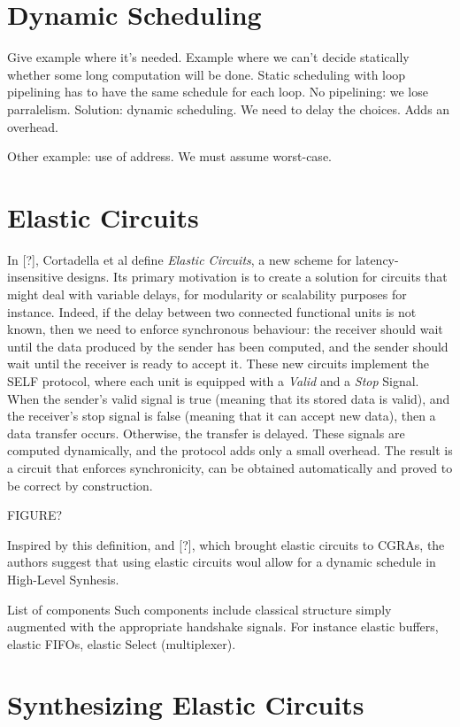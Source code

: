\documentclass{article}
\def\todo#1{{\color{red}#1}}
\begin{document}
\section{Dynamic Scheduling}
\todo{Give example where it's needed.}
Example where we can't decide statically whether some long computation will be done.
Static scheduling with loop pipelining has to have the same schedule for each loop.
No pipelining: we lose parralelism.
Solution: dynamic scheduling. We need to delay the choices. Adds an overhead.

Other example: use of address. We must assume worst-case.

\section{Elastic Circuits}

In [?], Cortadella et al define \textit{Elastic Circuits}, a new scheme for latency-insensitive designs.
Its primary motivation is to create a solution for circuits that might deal with variable delays, for modularity or scalability purposes for instance.
Indeed, if the delay between two connected functional units is not known, then we need to enforce synchronous behaviour: the receiver should wait until the data produced by the sender has been computed, and the sender should wait until the receiver is ready to accept it.
These new circuits implement the SELF protocol, where each unit is equipped with a \textit{Valid} and a \textit{Stop} Signal. When the sender's valid signal is true (meaning that its stored data is valid), and the receiver's stop signal is false (meaning that it can accept new data), then a data transfer occurs. Otherwise, the transfer is delayed. These signals are computed dynamically, and the protocol adds only a small overhead. The result is a circuit that enforces synchronicity, can be obtained automatically and proved to be correct by construction.

FIGURE?

Inspired by this definition, and [?], which brought elastic circuits to CGRAs, the authors suggest that using elastic circuits woul allow for a dynamic schedule in High-Level Synhesis.

\todo{List of components}
Such components include classical structure simply augmented with the appropriate handshake signals. For instance elastic buffers, elastic FIFOs, elastic Select (multiplexer).



\section{Synthesizing Elastic Circuits}
\end{document}
